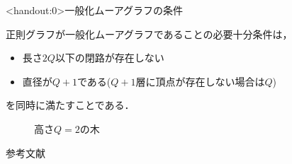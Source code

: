 \appendix
\begin{frame}<handout:0>{一般化ムーアグラフの条件}
  \begin{thm}
    正則グラフが一般化ムーアグラフであることの必要十分条件は，
    \begin{itemize}
    \item 長さ$2Q$以下の閉路が存在しない
    \item 直径が$Q+1$である($Q+1$層に頂点が存在しない場合は$Q$)
    \end{itemize}
    を同時に満たすことである．
  \end{thm}
  \begin{figure}
    \centering
    \def\svgwith{.4\textwidth}
    \resizebox{.4\textwidth}{!}{
      
    }
    \caption{高さ$Q=2$の木}
  \end{figure}
\end{frame}

\begin{frame}[allowframebreaks]{参考文献}
  
\end{frame}

